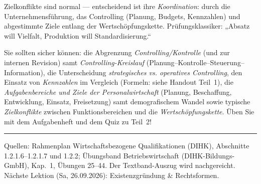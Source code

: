 \documentclass[11pt, a4paper]{article}
\begin{document}
\begin{merksatz}
Zielkonflikte sind normal --- entscheidend ist ihre \emph{Koordination}: durch die
Unternehmensführung, das Controlling (Planung, Budgets, Kennzahlen) und abgestimmte
Ziele entlang der Wertschöpfungskette. Prüfungsklassiker: „Absatz will Vielfalt,
Produktion will Standardisierung.``
\end{merksatz}

\begin{merksatz}[title={\bfseries Wichtig für die Prüfungsvorbereitung (Teil 2)}]
Sie sollten sicher können: die Abgrenzung \emph{Controlling/Kontrolle} (und zur internen
Revision) samt \emph{Controlling-Kreislauf} (Planung--Kontrolle--Steuerung--Information),
die Unterscheidung \emph{strategisches vs. operatives Controlling}, den Einsatz von
\emph{Kennzahlen} im Vergleich (Formeln: siehe Handout Teil~1), die
\emph{Aufgabenbereiche und Ziele der Personalwirtschaft} (Planung, Beschaffung,
Entwicklung, Einsatz, Freisetzung) samt demografischem Wandel sowie typische
\emph{Zielkonflikte} zwischen Funktionsbereichen und die \emph{Wertschöpfungskette}.
Üben Sie mit dem Aufgabenheft und dem Quiz zu Teil~2!
\end{merksatz}

\vspace{1em}
\hrule
\vspace{0.8em}
\noindent\textsf{\small Quellen: Rahmenplan Wirtschaftsbezogene Qualifikationen (DIHK),
Abschnitte 1.2.1.6--1.2.1.7 und 1.2.2; Übungsband Betriebswirtschaft (DIHK-Bildungs-GmbH),
Kap.~1, Übungen 25--44. Der Textband-Auszug wird nachgereicht. Nächste Lektion
(Sa, 26.09.2026): Existenzgründung \& Rechtsformen.}
\end{document}
